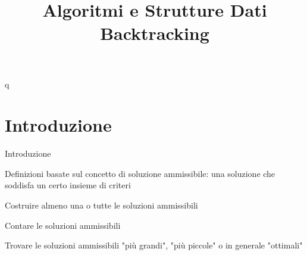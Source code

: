
\title[ASD - Backtracking]{\textbf{Algoritmi e Strutture Dati}\\[24pt]Backtracking}

\usepackage[mode=buildnew]{standalone}
\usepackage{xcolor}
\usepackage{colortbl}
\usepackage{epigraph}
\usepackage{tikz}
\usepackage{xmpmulti}
\usepackage{listings}


\newcommand{\R}[1]{\textcolor{red}{#1}}
\newcommand{\B}[1]{\textcolor{blue}{#1}}

\renewcommand{\arraystretch}{1.4}
\graphicspath{{figs/16/}}

\renewcommand{\enumerazione}{\fontproc{enumeration}}
\newcommand{\isAdmissible}{\fontproc{isAdmissible}}




\FrameTitle{}q

\FrameContent



\section{Introduzione}

\begin{frame}{Introduzione}


\BI
\item Definizioni basate sul concetto di \alert{soluzione ammissibile}: una soluzione
che soddisfa un certo insieme di criteri
\EI

\BI
\item Costruire almeno una o tutte le soluzioni ammissibili
\item Contare le soluzioni ammissibili
\item Trovare le soluzioni ammissibili "più grandi", "più piccole" o in generale "ottimali"
\EI

\end{frame}


